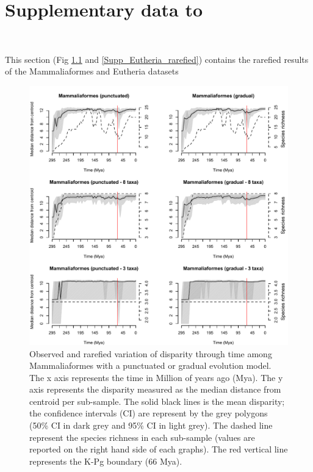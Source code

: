 \chapter{Supplementary data to }
\label{chap:Appendix_STD}

\bigskip
\medskip
\begin{center}

 \\
\bigskip
\end{center}

This section (Fig \ref{Supp_Mammaliaformes_rarefied} and \ref{Supp_Eutheria_rarefied}) contains the rarefied results of the Mammaliaformes and Eutheria datasets

\begin{figure}
\centering
    \includegraphics[keepaspectratio=true]{Supplementaries/Figures/STD/Slater_full.pdf}
\caption[Mammaliaformes disparity (rarefied)]{Observed and rarefied variation of disparity through time among Mammaliaformes with a punctuated or gradual evolution model. The x axis represents the time in Million of years ago (Mya). The y axis represents the disparity measured as the median distance from centroid per sub-sample. The solid black lines is the mean disparity; the confidence intervals (CI) are represent by the grey polygons (50\% CI in dark grey and 95\% CI in light grey). The dashed line represent the species richness in each sub-sample (values are reported on the right hand side of each graphs). The red vertical line represents the K-Pg boundary (66 Mya).}
\label{Supp_Mammaliaformes_rarefied}
\end{figure}

